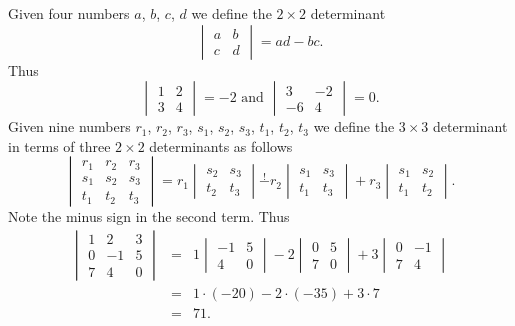Given four numbers $a$, $b$, $c$, $d$ we define the $2 \times 2$ determinant
\[
\begin{vmatrix}
a & b \\
c & d
\end{vmatrix} = ad - bc.
\]
Thus
\[
\begin{vmatrix}
1 & 2 \\
3 & 4
\end{vmatrix} = -2 \text{ and }
\begin{vmatrix}
3 & -2 \\
-6 & 4
\end{vmatrix} = 0.
\]
Given nine numbers $r_1$, $r_2$, $r_3$, $s_1$, $s_2$, $s_3$, $t_1$, $t_2$, $t_3$ we define the $3 \times 3$ determinant in terms of three $2 \times 2$ determinants as follows
\[
\begin{vmatrix}
r_1 & r_2 & r_3 \\
s_1 & s_2 & s_3 \\
t_1 & t_2 & t_3
\end{vmatrix} 
=
r_1 \begin{vmatrix}
s_2 & s_3 \\
t_2 & t_3
\end{vmatrix}
\stackrel{!}{-}
r_2 \begin{vmatrix}
s_1 & s_3 \\
t_1 & t_3
\end{vmatrix}
+
r_3 \begin{vmatrix}
s_1 & s_2 \\
t_1 & t_2
\end{vmatrix}.
\]
Note the minus sign in the second term.  Thus
\begin{eqnarray*}
\begin{vmatrix}
1 & 2 & 3 \\
0 & -1 & 5 \\
7 & 4 & 0
\end{vmatrix} 
& = &
1 \begin{vmatrix}
-1 & 5 \\
4 & 0
\end{vmatrix}
-
2 \begin{vmatrix}
0 & 5 \\
7 & 0
\end{vmatrix}
+
3 \begin{vmatrix}
0 & -1 \\
7 & 4
\end{vmatrix} \\
 & = & 1 \cdot (-20) - 2 \cdot (-35) + 3 \cdot 7 \\
 & = & 71.
\end{eqnarray*}
